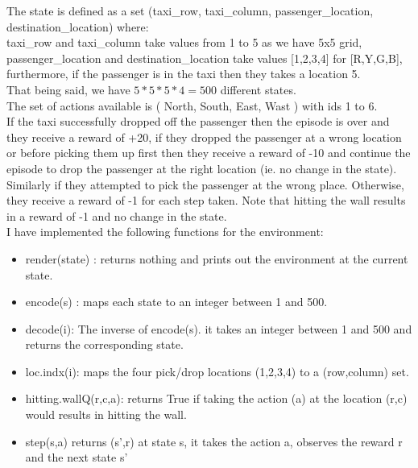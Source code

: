 \documentclass[twoside,twocolumn]{article}
\begin{document}
The state is defined as a set (taxi\_row, taxi\_column, passenger\_location, destination\_location) where:\\
taxi\_row and taxi\_column take values from 1 to 5 as we have 5x5 grid,\\
passenger\_location and destination\_location take values [1,2,3,4] for [R,Y,G,B], furthermore, if the passenger is in the taxi then they takes a location 5.\\
That being said, we have $5*5*5*4=500$  different states.\\

The set of actions available is ( North, South, East, Wast ) with ids 1 to 6.\\

If the taxi successfully dropped off the passenger then the episode is over and they receive a reward of +20, if they dropped the passenger at a wrong location or before picking them up first then they receive a reward of -10 and continue the episode to drop the passenger at the right location (ie. no change in the state). Similarly if they attempted to pick the passenger at the wrong place. Otherwise, they receive a reward of -1 for each step taken. Note that hitting the wall results in a reward of -1 and no change in the state.\\

I have implemented the following functions for the environment:\\
\begin{itemize}
\item render(state) : returns nothing and prints out the environment at the current state.\\

\item encode(s) : maps each state to an integer between 1 and 500.\\

\item decode(i): The inverse of encode(s). it takes an integer between 1 and 500 and returns the corresponding state.\\

\item loc.indx(i): maps the four pick/drop locations (1,2,3,4) to a (row,column) set.\\

\item hitting.wallQ(r,c,a): returns True if taking the action (a) at the location (r,c) would results in hitting the wall.\\

\item step(s,a) returns (s',r) at state s, it takes the action a, observes the reward r and the next state s' 
\end{itemize}
 
\end{document}
